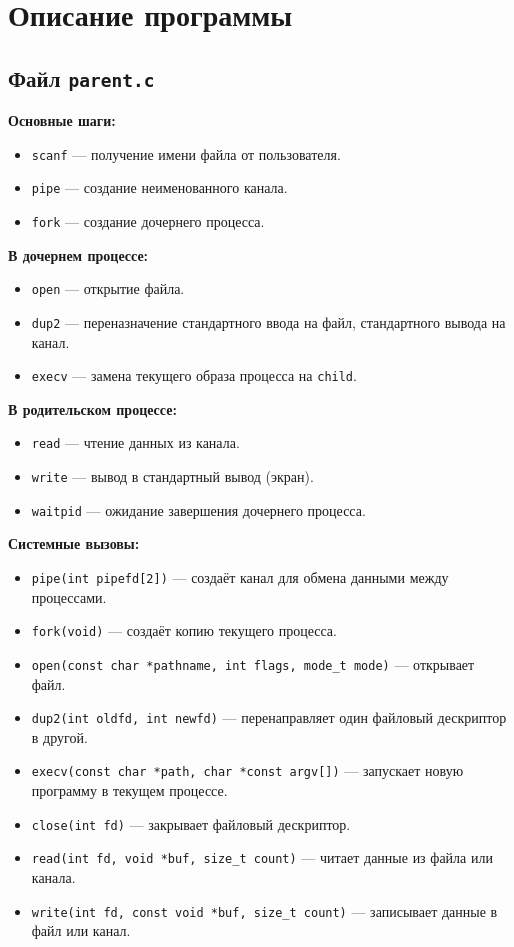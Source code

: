 \section{Описание программы}

\subsection*{Файл \texttt{parent.c}}
\textbf{Основные шаги:}
\begin{itemize}
    \item \texttt{scanf} — получение имени файла от пользователя.
    \item \texttt{pipe} — создание неименованного канала.
    \item \texttt{fork} — создание дочернего процесса.
\end{itemize}

\textbf{В дочернем процессе:}
\begin{itemize}
    \item \texttt{open} — открытие файла.
    \item \texttt{dup2} — переназначение стандартного ввода на файл, стандартного вывода на канал.
    \item \texttt{execv} — замена текущего образа процесса на \texttt{child}.
\end{itemize}

\textbf{В родительском процессе:}
\begin{itemize}
    \item \texttt{read} — чтение данных из канала.
    \item \texttt{write} — вывод в стандартный вывод (экран).
    \item \texttt{waitpid} — ожидание завершения дочернего процесса.
\end{itemize}

\textbf{Системные вызовы:}
\begin{itemize}
    \item \texttt{pipe(int pipefd[2])} — создаёт канал для обмена данными между процессами.
    \item \texttt{fork(void)} — создаёт копию текущего процесса.
    \item \texttt{open(const char *pathname, int flags, mode\_t mode)} — открывает файл.
    \item \texttt{dup2(int oldfd, int newfd)} — перенаправляет один файловый дескриптор в другой.
    \item \texttt{execv(const char *path, char *const argv[])} — запускает новую программу в текущем процессе.
    \item \texttt{close(int fd)} — закрывает файловый дескриптор.
    \item \texttt{read(int fd, void *buf, size\_t count)} — читает данные из файла или канала.
    \item \texttt{write(int fd, const void *buf, size\_t count)} — записывает данные в файл или канал.
\end{itemize}

